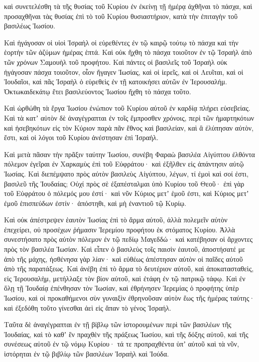 {καὶ συνετελέσθη τὰ τῆς θυσίας τοῦ Κυρίου ἐν ἐκείνῃ τῇ ἡμέρᾳ ἀχθῆναι τὸ πάσχα,
καὶ προσαχθῆναι τὰς θυσίας ἐπὶ τὸ τοῦ Κυρίου θυσιαστήριον, κατὰ τὴν ἐπιταγὴν τοῦ βασιλέως Ἰωσίου.
\par }{\PP {}Καὶ ἠγάγοσαν οἱ υἱοὶ Ἰσραὴλ οἱ εὑρεθέντες ἐν τῷ καιρῷ τούτῳ τὸ πάσχα καὶ τὴν ἑορτὴν τῶν ἀζύμων ἡμέρας ἑπτά.
Καὶ οὐκ ἤχθη τὸ πάσχα τοιοῦτον ἐν τῷ Ἰσραὴλ ἀπὸ τῶν χρόνων Σαμουὴλ τοῦ προφήτου.
Καὶ πάντες οἱ βασιλεῖς τοῦ Ἰσραὴλ οὐκ ἠγάγοσαν πάσχα τοιοῦτον, οἷον ἤγαγεν Ἰωσίας, καὶ οἱ ἱερεῖς, καὶ οἱ Λευῖται, καὶ οἱ Ἰουδαῖοι, καὶ πᾶς Ἰσραὴλ ὁ εὑρεθεὶς ἐν τῇ κατοικήσει αὐτῶν ἐν Ἱερουσαλήμ.
Ὀκτωκαιδεκάτῳ ἔτει βασιλεύοντος Ἰωσίου ἤχθη τὸ πάσχα τοῦτο.
\par }{\PP {}Καὶ ὠρθώθη τὰ ἔργα Ἰωσίου ἐνώπιον τοῦ Κυρίου αὐτοῦ ἐν καρδίᾳ πλήρει εὐσεβείας.
Καὶ τὰ κατʼ αὐτὸν δὲ ἀναγέγραπται ἐν τοῖς ἔμπροσθεν χρόνοις, περὶ τῶν ἡμαρτηκότων καὶ ἠσεβηκότων εἰς τὸν Κύριον παρὰ πᾶν ἔθνος καὶ βασιλείαν, καὶ ἃ ἐλύπησαν αὐτὸν, ἔστι, καὶ οἱ λόγοι τοῦ Κυρίου ἀνέστησαν ἐπὶ Ἰσραήλ.
\par }{\PP {}Καὶ μετὰ πᾶσαν τὴν πρᾶξιν ταύτην Ἰωσίου, συνέβη Φαραὼ βασιλέα Αἰγύπτου ἐλθόντα πόλεμον ἐγεῖραι ἐν Χαρκαμὺς ἐπὶ τοῦ Εὐφράτου· καὶ ἐξῆλθεν εἰς ἀπάντησιν αὐτῷ Ἰωσίας.
Καὶ διεπέμψατο πρὸς αὐτὸν βασιλεὺς Αἰγύπτου, λέγων, τί ἐμοὶ καὶ σοί ἐστι, βασιλεῦ τῆς Ἰουδαίας;
Οὐχί πρὸς σὲ ἐξαπέσταλμαι ὑπὸ Κυρίου τοῦ Θεοῦ· ἐπὶ γὰρ τοῦ Εὐφράτου ὁ πόλεμός μου ἐστί· καὶ νῦν Κύριος μετʼ ἑμοῦ ἐστι, καὶ Κύριος μετʼ ἐμοῦ ἑπισπεύδων ἐστίν· ἀπόστηθι, καὶ μὴ ἐναντιοῦ τῷ Κυρίῳ.
\par }{\PP {}Καὶ οὐκ ἀπέστρεψεν ἑαυτὸν Ἰωσίας ἐπὶ τὸ ἅρμα αὐτοῦ, ἀλλὰ πολεμεῖν αὐτὸν ἐπεχείρει, οὐ προσέχων ῥήμασιν Ἰερεμίου προφήτου ἐκ στόματος Κυρίου.
Ἀλλὰ συνεστήσατο πρὸς αὐτὸν πόλεμον ἐν τῷ πεδίῳ Μαγεδδώ· καὶ κατέβησαν οἱ ἄρχοντες πρὸς τὸν βασιλέα Ἰωσίαν.
Καὶ εἶπεν ὁ βασιλεὺς τοῖς παισὶν ἑαυτοῦ, ἀποστήσατέ με ἀπὸ τῆς μάχης, ἠσθένησα γὰρ λίαν· καὶ εὐθέως ἀπέστησαν αὐτὸν οἱ παῖδες αὐτοῦ ἀπὸ τῆς παρατάξεως.
Καὶ ἀνέβη ἐπὶ τὸ ἅρμα τὸ δευτέριον αὐτοῦ, καὶ ἀποκατασταθεὶς, εἰς Ἰερουσαλὴμ, μετήλλαξε τὸν βίον αὐτοῦ, καὶ ἐτάφη ἐν τῷ πατρικῷ τάφῳ.
Καὶ ἐν ὅλῃ τῇ Ἰουδαίᾳ ἐπένθησαν τὸν Ἰωσίαν, καὶ ἐθρήνησεν Ἱερεμίας ὁ προφήτης ὑπὲρ Ἰωσίου, καὶ οἱ προκαθήμενοι σὺν γυναιξὶν ἐθρηνοῦσαν αὐτὸν ἕως τῆς ἡμέρας ταύτης· καὶ ἐξεδόθη τοῦτο γίνεσθαι ἀεὶ εἰς ἅπαν τὸ γένος Ἰσραήλ.
\par }{\PP {}Ταῦτα δὲ ἀναγέγραπται ἐν τῇ βίβλῳ τῶν ἱστορουμένων περὶ τῶν βασιλέων τῆς Ἰουδαίας, καὶ τὸ καθʼ ἓν πραχθὲν τῆς πράξεως Ἰωσίου, καὶ τῆς δόξης αὐτοῦ, καὶ τῆς συνέσεως αὐτοῦ ἐν τῷ νόμῳ Κυρίου· τά τε προπραχθέντα ὑπʼ αὐτοῦ καὶ τὰ νῦν, ἱστόρηται ἐν τῷ βιβλίῳ τῶν βασιλέων Ἰσραὴλ καὶ Ἰούδα.
}
